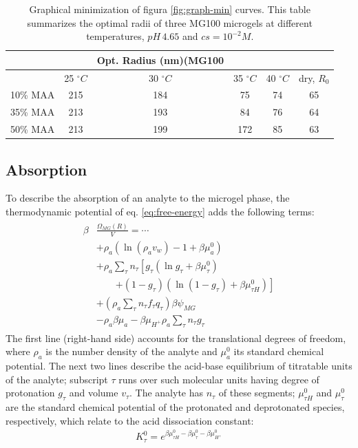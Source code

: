 \begin{table}[!htb]
\centering
\small
  \begin{tabular}{|lccccc|}
   \hline %
    	&&   Opt. Radius (nm)(MG100 & && \\
    	\hline
      & {25 $^\circ C$} & {30 $^\circ C$} & {35 $^\circ C$} & {40 $^\circ C$} & {dry, $R_0$} \\
      \hline
    10\% MAA & 215 &  184 &  75  &  74 & 65\\
    35\% MAA &  213 &  193 &  84 & 76 & 64\\
    50\% MAA &  213 & 199 &  172 & 85 & 63\\
    \hline
  \end{tabular}
 \caption{Graphical minimization of figura \ref{fig:graph-min} curves.
 This table summarizes the optimal radii of three MG100 microgels at different temperatures, $pH\,4.65$ and $cs=10^{-2}M$.}
\label{table:optimal-R} 
\end{table}


\subsection{Absorption}




To describe the absorption of an analyte to the microgel phase, 
the thermodynamic potential of eq. \ref{eq:free-energy} adds the following terms:
%
%
\begin{align}
\begin{aligned}
\beta&\frac{\Omega_{MG}(R)}{V}= \cdots\\&+ \rho_a\left(\ln\left(\rho_a v_w\right) -1 + \beta\mu^0_a\right) \\
& + \rho_a \sum_\tau n_\tau  \left[g_\tau(\ln g_\tau+ \beta\mu^0_{\tau})\right.\\
&\qquad\left.+(1-g_\tau)(\ln (1-g_\tau)+\beta\mu^0_{\tau H})\right] \\
& +  \left( \rho_a \sum_\tau n_\tau f_\tau q_\tau\right)\beta\psi_{MG}\\
& -\rho_a\beta\mu_a
 -\beta\mu_{H^+} \rho_a \sum_\tau n_\tau g_\tau
\end{aligned}
\label{eq:ads}
\end{align}
%
\noindent The first line (right-hand side) accounts for the translational degrees of freedom,
where $\rho_a$ is the number density of the analyte and $\mu_a^0$ its standard chemical potential.
The next two lines describe the acid-base equilibrium of titratable units of the analyte;
subscript $\tau$ runs over such molecular units having degree of protonation $g_\tau$ and volume $v_\tau$.
The analyte has $n_\tau$ of these segments;
$\mu^0_{\tau H}$ and $\mu^0_\tau$ are the standard chemical potential of the protonated and deprotonated species, respectively, which relate to the acid dissociation constant:
%
\begin{align}
K^0_{\tau}= e^{\beta\mu^0_{\tau H}-\beta\mu^0_{\tau}-\beta\mu^0_{H^+}}
\end{align}
%

